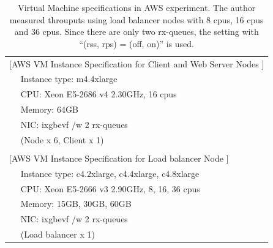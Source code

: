 {
\setlength{\tabcolsep}{3em}
\renewcommand{\arraystretch}{1.1}

\begin{table}[h]
  \centering
  \begin{tabular}{ll}
    \hline 
    \multicolumn{2}{l}{[AWS VM Instance Specification for Client and Web Server Nodes ]}   \\
    & Instance type: m4.4xlarge \\
    & CPU: Xeon E5-2686 v4 2.30GHz, 16 cpus \\
    & Memory: 64GB \\
    & NIC: ixgbevf /w 2 rx-queues \\
    & (Node x 6, Client x 1) \\
    & \\
    \multicolumn{2}{l}{[AWS VM Instance Specification for Load balancer Node ]}   \\
    & Instance type: c4.2xlarge, c4.4xlarge, c4.8xlarge  \\
    & CPU: Xeon E5-2666 v3 2.90GHz, 8, 16, 36 cpus \\
    & Memory: 15GB, 30GB, 60GB \\
    & NIC: ixgbevf /w 2 rx-queues \\
    & (Load balancer x 1) \\
    \hline
  \end{tabular}
  \par\bigskip
  \centering
  \begin{minipage}{0.8\columnwidth}
    \caption[Virtual Machine specifications in AWS experiment]{
Virtual Machine specifications in AWS experiment.
The author measured throuputs using load balancer nodes with 8 cpus, 16 cpus and 36 cpus.
Since there are only two rx-queues, the setting with \enquote{(rss, rps) = (off, on)} is used.
    }
    \label{fig:aws_machine_spec}
  \end{minipage}
\end{table}
}


